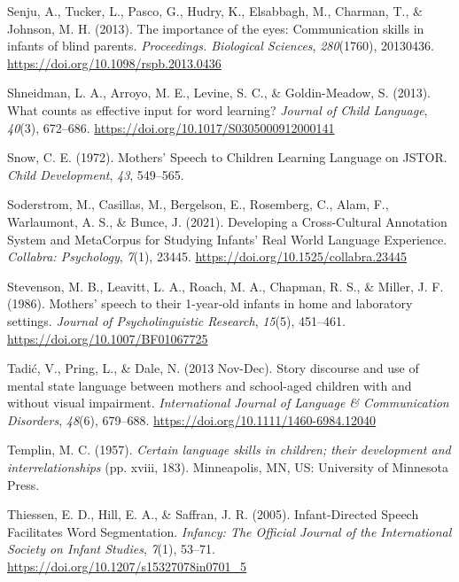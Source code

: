 \documentclass[
  man,floatsintext]{apa6}
\newlength{\cslhangindent}
\newlength{\cslentryspacingunit} %
\newenvironment{CSLReferences}[2] %
 {%
  \setlength{\parindent}{0pt}
  \ifodd #1
  \let\oldpar\par
  \def\par{\hangindent=\cslhangindent\oldpar}
  \fi
  \setlength{\parskip}{#2\cslentryspacingunit}
 }%
 {}
\begin{document}
\begin{CSLReferences}{1}{0}
\leavevmode{}%
Senju, A., Tucker, L., Pasco, G., Hudry, K., Elsabbagh, M., Charman, T., \& Johnson, M. H. (2013). The importance of the eyes: Communication skills in infants of blind parents. \emph{Proceedings. Biological Sciences}, \emph{280}(1760), 20130436. \url{https://doi.org/10.1098/rspb.2013.0436}

\leavevmode{}%
Shneidman, L. A., Arroyo, M. E., Levine, S. C., \& Goldin-Meadow, S. (2013). What counts as effective input for word learning? \emph{Journal of Child Language}, \emph{40}(3), 672--686. \url{https://doi.org/10.1017/S0305000912000141}

\leavevmode{}%
Snow, C. E. (1972). Mothers' {Speech} to {Children Learning Language} on {JSTOR}. \emph{Child Development}, \emph{43}, 549--565.

\leavevmode{}%
Soderstrom, M., Casillas, M., Bergelson, E., Rosemberg, C., Alam, F., Warlaumont, A. S., \& Bunce, J. (2021). Developing a {Cross-Cultural Annotation System} and {MetaCorpus} for {Studying Infants}' {Real World Language Experience}. \emph{Collabra: Psychology}, \emph{7}(1), 23445. \url{https://doi.org/10.1525/collabra.23445}

\leavevmode{}%
Stevenson, M. B., Leavitt, L. A., Roach, M. A., Chapman, R. S., \& Miller, J. F. (1986). Mothers' speech to their 1-year-old infants in home and laboratory settings. \emph{Journal of Psycholinguistic Research}, \emph{15}(5), 451--461. \url{https://doi.org/10.1007/BF01067725}

\leavevmode{}%
Tadić, V., Pring, L., \& Dale, N. (2013 Nov-Dec). Story discourse and use of mental state language between mothers and school-aged children with and without visual impairment. \emph{International Journal of Language \& Communication Disorders}, \emph{48}(6), 679--688. \url{https://doi.org/10.1111/1460-6984.12040}

\leavevmode{}%
Templin, M. C. (1957). \emph{Certain language skills in children; their development and interrelationships} (pp. xviii, 183). {Minneapolis, MN, US}: {University of Minnesota Press}.

\leavevmode{}%
Thiessen, E. D., Hill, E. A., \& Saffran, J. R. (2005). Infant-{Directed Speech Facilitates Word Segmentation}. \emph{Infancy: The Official Journal of the International Society on Infant Studies}, \emph{7}(1), 53--71. \url{https://doi.org/10.1207/s15327078in0701_5}


\end{CSLReferences}
\end{document}
